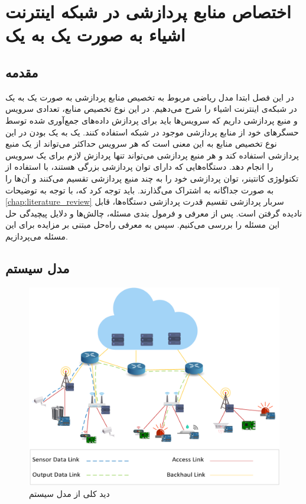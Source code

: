\chapter{اختصاص منابع پردازشی در شبکه اینترنت اشیاء به صورت یک به یک}\label{chap:one_to_one_allocation}
  \thispagestyle{empty}
  \section{مقدمه}
    در این فصل ابتدا مدل ریاضی مربوط به تخصیص منابع پردازشی به صورت یک به یک در شبکه‌ی اینترنت اشیاء را شرح می‌دهیم. 
    در این نوع تخصیص منابع، تعدادی سرویس و منبع پردازشی داریم که سرویس‌ها باید برای پردازش داده‌های جمع‌آوری شده توسط حسگر‌های خود از منابع پردازشی موجود در شبکه استفاده کنند.
    یک به یک بودن در این نوع تخصیص منابع به این معنی است که هر سرویس حداکثر می‌تواند از یک منبع پردازشی استفاده کند و هر منبع پردازشی می‌تواند تنها پردازش لازم برای یک سرویس را انجام دهد.
    دستگاه‌هایی که دارای توان پردازشی بزرگی هستند، با استفاده از تکنولوژی کانتینر‌، توان پردازشی خود را به چند منبع پردازشی تقسیم می‌کنند و آن‌ها را به صورت جداگانه به اشتراک می‌گذارند.
    باید توجه کرد که، با توجه به توضیحات \cref{chap:literature_review} سربار پردازشی تقسیم قدرت پردازشی دستگاه‌ها، قابل نادیده گرفتن است.
    پس از معرفی و فرمول بندی مسئله، چالش‌ها و دلایل پیچیدگی حل این مسئله را بررسی می‌کنیم.
    سپس به معرفی راه‌حل مبتنی بر مزایده برای این مسئله می‌پردازیم.
  \section{مدل سیستم}
    \begin{figure}[h]
      \centerline{\includegraphics[width=12cm]{graphics/one_to_one/system_model}}
      \caption{دید کلی از مدل سیستم}
      \label{fig:ono_to_one_system_model}
    \end{figure}

